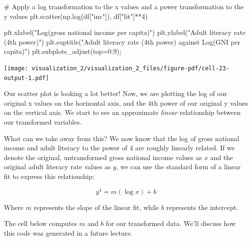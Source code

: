 \documentclass[
  letterpaper,
  DIV=11,
  numbers=noendperiod]{scrreprt}
\newenvironment{Shaded}{\begin{snugshade}}{\end{snugshade}}
\newcommand{\CommentTok}[1]{\textcolor[rgb]{0.37,0.37,0.37}{#1}}
\newcommand{\DecValTok}[1]{\textcolor[rgb]{0.68,0.00,0.00}{#1}}
\newcommand{\FloatTok}[1]{\textcolor[rgb]{0.68,0.00,0.00}{#1}}
\newcommand{\NormalTok}[1]{\textcolor[rgb]{0.00,0.23,0.31}{#1}}
\newcommand{\OperatorTok}[1]{\textcolor[rgb]{0.37,0.37,0.37}{#1}}
\newcommand{\StringTok}[1]{\textcolor[rgb]{0.13,0.47,0.30}{#1}}
\begin{document}
\begin{Shaded}
\begin{Highlighting}[]
\CommentTok{\# Apply a log transformation to the x values and a power transformation to the y values}
\NormalTok{plt.scatter(np.log(df[}\StringTok{"inc"}\NormalTok{]), df[}\StringTok{"lit"}\NormalTok{]}\OperatorTok{**}\DecValTok{4}\NormalTok{)}

\NormalTok{plt.xlabel(}\StringTok{"Log(gross national income per capita)"}\NormalTok{)}
\NormalTok{plt.ylabel(}\StringTok{"Adult literacy rate (4th power)"}\NormalTok{)}
\NormalTok{plt.suptitle(}\StringTok{"Adult literacy rate (4th power) against Log(GNI per capita)"}\NormalTok{)}
\NormalTok{plt.subplots\_adjust(top}\OperatorTok{=}\FloatTok{0.9}\NormalTok{)}\OperatorTok{;}
\end{Highlighting}
\end{Shaded}

\texttt{[image: visualization\_2/visualization\_2\_files/figure-pdf/cell-23-output-1.pdf]}

Our scatter plot is looking a lot better! Now, we are plotting the log
of our original x values on the horizontal axis, and the 4th power of
our original y values on the vertical axis. We start to see an
approximate \emph{linear} relationship between our transformed
variables.

What can we take away from this? We now know that the log of gross
national income and adult literacy to the power of 4 are roughly
linearly related. If we denote the original, untransformed gross
national income values as \(x\) and the original adult literacy rate
values as \(y\), we can use the standard form of a linear fit to express
this relationship:

\[y^4 = m(\log{x}) + b\]

Where \(m\) represents the slope of the linear fit, while \(b\)
represents the intercept.

The cell below computes \(m\) and \(b\) for our transformed data. We'll
discuss how this code was generated in a future lecture.
\end{document}
